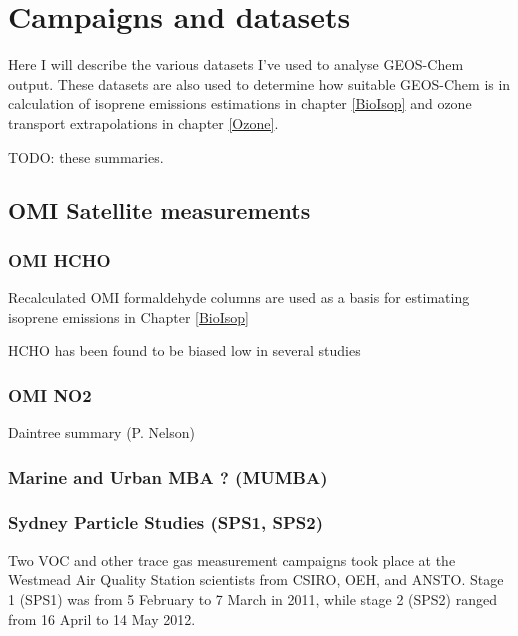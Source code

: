 \section{Campaigns and datasets}
  \label{Model:Datasets}
  Here I will describe the various datasets I've used to analyse GEOS-Chem output.
  These datasets are also used to determine how suitable GEOS-Chem is in calculation of isoprene emissions estimations in chapter \ref{BioIsop} and ozone transport extrapolations in chapter \ref{Ozone}.
  
  TODO: these summaries.
  
  \subsection{OMI Satellite measurements}
  \label{Model:Datasets:OMI}
  
    \subsubsection{OMI HCHO}
    Recalculated OMI formaldehyde columns are used as a basis for estimating isoprene emissions in Chapter \ref{BioIsop}
    
    HCHO has been found to be biased low in several studies \cite[eg.][]{Zhu2016,DeSmedt2015,Barkley2013}
  
    \subsubsection{OMI NO2}
    \label{Model:Datasets:OMNO2d}

  Daintree summary (P. Nelson)
  
  \subsubsection{Marine and Urban MBA ? (MUMBA)}
    \label{Model:Datasets:MUMBA}
  
  \subsubsection{Sydney Particle Studies (SPS1, SPS2)}
    \label{Model:Datasets:SPS}
    Two VOC and other trace gas measurement campaigns took place at the Westmead Air Quality Station scientists from CSIRO, OEH, and ANSTO. 
    Stage 1 (SPS1) was from 5 February to 7 March in 2011, while stage 2 (SPS2) ranged from 16 April to 14 May 2012.
    
